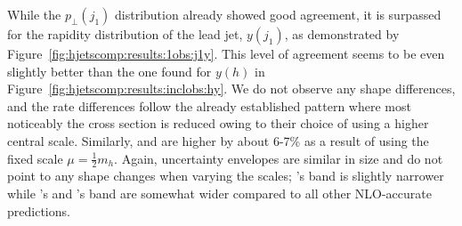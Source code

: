 While the $p_\perp(j_1)$ distribution already showed good agreement,
it is surpassed for the rapidity distribution of the lead jet,
$y(j_1)$, as demonstrated by Figure~\ref{fig:hjetscomp:results:1obs:j1y}.
This level of agreement seems to be even slightly better than the one
found for $y(h)$ in Figure~\ref{fig:hjetscomp:results:inclobs:hy}.
We do not observe any shape differences, and the rate differences 
follow the already established pattern where most noticeably the
\MGaMC cross section is reduced owing to their choice of using a
higher central scale. Similarly, \Sherpa \NNLOPS and \Resbos are
higher by about 6-7\% as a result of using the fixed scale
$\mu=\tfrac{1}{2}m_h$. Again, uncertainty envelopes are similar in
size and do not point to any shape changes when varying the scales;
\Herwig's band is slightly narrower while \Sherpa \MEPSatNLO's and
\MGaMC's band are somewhat wider compared to all other NLO-accurate
predictions.

